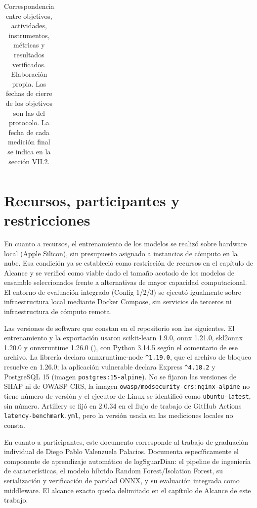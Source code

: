 {\begin{longtable}{|p{2.1cm}|p{2.6cm}|p{2.6cm}|p{2.5cm}|p{4.4cm}|}
\caption[Matriz de trazabilidad del proyecto]{Correspondencia entre objetivos, actividades, instrumentos, métricas y resultados verificados. Elaboración propia. Las fechas de cierre de los objetivos son las del protocolo. La fecha de cada medición final se indica en la sección VII.2.}
\label{tabla:trazabilidad}
\end{longtable}}

\section{Recursos, participantes y restricciones}\label{sec:recursos-participantes}

En cuanto a recursos, el entrenamiento de los modelos se realizó sobre hardware local (Apple Silicon), sin presupuesto asignado a instancias de cómputo en la nube. Esa condición ya se estableció como restricción de recursos en el capítulo de Alcance y se verificó como viable dado el tamaño acotado de los modelos de ensamble seleccionados frente a alternativas de mayor capacidad computacional. El entorno de evaluación integrado (Config 1/2/3) se ejecutó igualmente sobre infraestructura local mediante Docker Compose, sin servicios de terceros ni infraestructura de cómputo remota.

Las versiones de software que constan en el repositorio son las siguientes. El entrenamiento y la exportación usaron scikit-learn 1.9.0, onnx 1.21.0, skl2onnx 1.20.0 y onnxruntime 1.26.0 (), con Python 3.14.5 según el comentario de ese archivo. La librería declara onnxruntime-node \texttt{\textasciicircum{}1.19.0}, que el archivo de bloqueo resuelve en 1.26.0; la aplicación vulnerable declara Express \texttt{\textasciicircum{}4.18.2} y PostgreSQL 15 (imagen \texttt{postgres:15-alpine}). No se fijaron las versiones de SHAP ni de OWASP CRS, la imagen \texttt{owasp/modsecurity-crs:nginx-alpine} no tiene número de versión y el ejecutor de Linux se identificó como \texttt{ubuntu-latest}, sin número. Artillery se fijó en 2.0.34 en el flujo de trabajo de GitHub Actions \texttt{latency-benchmark.yml}, pero la versión usada en las mediciones locales no consta.

En cuanto a participantes, este documento corresponde al trabajo de graduación individual de Diego Pablo Valenzuela Palacios. Documenta específicamente el componente de aprendizaje automático de logSguarDian: el pipeline de ingeniería de características, el modelo híbrido Random Forest/Isolation Forest, su serialización y verificación de paridad ONNX, y su evaluación integrada como middleware. El alcance exacto queda delimitado en el capítulo de Alcance de este trabajo.

